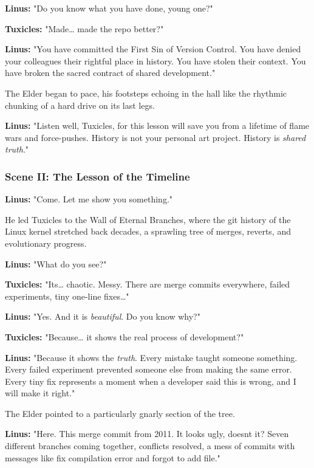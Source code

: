 \textbf{Linus:} "Do you know what you have done, young one?"

\textbf{Tuxicles:} "Made\ldots{} made the repo better?"

\textbf{Linus:} "You have committed the First Sin of Version Control. You have denied your colleagues their rightful place in history. You have stolen their context. You have broken the sacred contract of shared development."

The Elder began to pace, his footsteps echoing in the hall like the rhythmic chunking of a hard drive on its last legs.

\textbf{Linus:} "Listen well, Tuxicles, for this lesson will save you from a lifetime of flame wars and force-pushes. History is not your personal art project. History is \emph{shared truth}."

\bookdivider

\subsubsection{Scene II: The Lesson of the Timeline}\label{scene-ii-the-lesson-of-the-timeline}

\textbf{Linus:} "Come. Let me show you something."

He led Tuxicles to the Wall of Eternal Branches, where the git history of the Linux kernel stretched back decades, a sprawling tree of merges, reverts, and evolutionary progress.

\textbf{Linus:} "What do you see?"

\textbf{Tuxicles:} "It\textquotesingle s\ldots{} chaotic. Messy. There are merge commits everywhere, failed experiments, tiny one-line fixes\ldots"

\textbf{Linus:} "Yes. And it is \emph{beautiful}. Do you know why?"

\textbf{Tuxicles:} "Because\ldots{} it shows the real process of development?"

\textbf{Linus:} "Because it shows the \emph{truth}. Every mistake taught someone something. Every failed experiment prevented someone else from making the same error. Every tiny fix represents a moment when a developer said \textquotesingle this is wrong, and I will make it right.\textquotesingle"

The Elder pointed to a particularly gnarly section of the tree.

\textbf{Linus:} "Here. This merge commit from 2011. It looks ugly, doesn\textquotesingle t it? Seven different branches coming together, conflicts resolved, a mess of commits with messages like \textquotesingle fix compilation error\textquotesingle{} and \textquotesingle forgot to add file.\textquotesingle"

